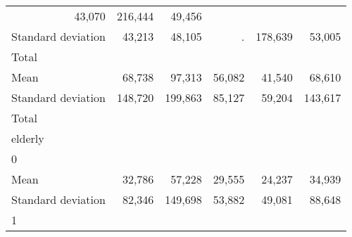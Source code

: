 \begin{tabular}{llllll}
  \multicolumn{1}{r}{43,070} &
  \multicolumn{1}{r}{216,444} &
  \multicolumn{1}{r}{49,456} \\
\multicolumn{1}{l}{\hspace{4em}Standard deviation} &
  \multicolumn{1}{|r}{43,213} &
  \multicolumn{1}{r}{48,105} &
  \multicolumn{1}{r}{.} &
  \multicolumn{1}{r}{178,639} &
  \multicolumn{1}{r}{53,005} \\
\multicolumn{1}{l}{\hspace{3em}Total} &
  \multicolumn{1}{|r}{} &
  \multicolumn{1}{r}{} &
  \multicolumn{1}{r}{} &
  \multicolumn{1}{r}{} &
  \multicolumn{1}{r}{} \\
\multicolumn{1}{l}{\hspace{4em}Mean} &
  \multicolumn{1}{|r}{68,738} &
  \multicolumn{1}{r}{97,313} &
  \multicolumn{1}{r}{56,082} &
  \multicolumn{1}{r}{41,540} &
  \multicolumn{1}{r}{68,610} \\
\multicolumn{1}{l}{\hspace{4em}Standard deviation} &
  \multicolumn{1}{|r}{148,720} &
  \multicolumn{1}{r}{199,863} &
  \multicolumn{1}{r}{85,127} &
  \multicolumn{1}{r}{59,204} &
  \multicolumn{1}{r}{143,617} \\
\multicolumn{1}{l}{\hspace{1em}Total} &
  \multicolumn{1}{|r}{} &
  \multicolumn{1}{r}{} &
  \multicolumn{1}{r}{} &
  \multicolumn{1}{r}{} &
  \multicolumn{1}{r}{} \\
\multicolumn{1}{l}{\hspace{2em}elderly} &
  \multicolumn{1}{|r}{} &
  \multicolumn{1}{r}{} &
  \multicolumn{1}{r}{} &
  \multicolumn{1}{r}{} &
  \multicolumn{1}{r}{} \\
\multicolumn{1}{l}{\hspace{3em}0} &
  \multicolumn{1}{|r}{} &
  \multicolumn{1}{r}{} &
  \multicolumn{1}{r}{} &
  \multicolumn{1}{r}{} &
  \multicolumn{1}{r}{} \\
\multicolumn{1}{l}{\hspace{4em}Mean} &
  \multicolumn{1}{|r}{32,786} &
  \multicolumn{1}{r}{57,228} &
  \multicolumn{1}{r}{29,555} &
  \multicolumn{1}{r}{24,237} &
  \multicolumn{1}{r}{34,939} \\
\multicolumn{1}{l}{\hspace{4em}Standard deviation} &
  \multicolumn{1}{|r}{82,346} &
  \multicolumn{1}{r}{149,698} &
  \multicolumn{1}{r}{53,882} &
  \multicolumn{1}{r}{49,081} &
  \multicolumn{1}{r}{88,648} \\
\multicolumn{1}{l}{\hspace{3em}1} &

\end{tabular}

